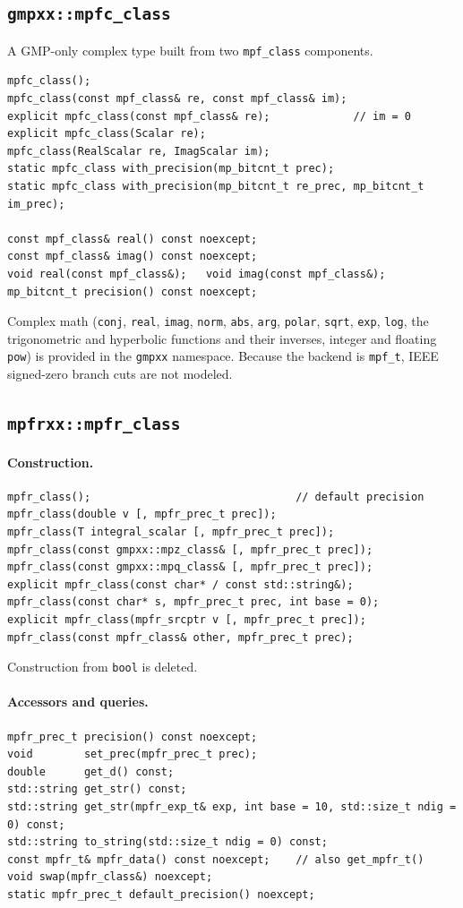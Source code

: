 \documentclass[11pt,a4paper]{article}
\newcommand{\code}[1]{\lstinline!#1!}
\begin{document}
\subsection{\code{gmpxx::mpfc_class}}

A GMP-only complex type built from two \code{mpf_class} components.

\begin{lstlisting}
mpfc_class();
mpfc_class(const mpf_class& re, const mpf_class& im);
explicit mpfc_class(const mpf_class& re);             // im = 0
explicit mpfc_class(Scalar re);
mpfc_class(RealScalar re, ImagScalar im);
static mpfc_class with_precision(mp_bitcnt_t prec);
static mpfc_class with_precision(mp_bitcnt_t re_prec, mp_bitcnt_t im_prec);

const mpf_class& real() const noexcept;
const mpf_class& imag() const noexcept;
void real(const mpf_class&);   void imag(const mpf_class&);
mp_bitcnt_t precision() const noexcept;
\end{lstlisting}

Complex math (\code{conj}, \code{real}, \code{imag}, \code{norm}, \code{abs},
\code{arg}, \code{polar}, \code{sqrt}, \code{exp}, \code{log}, the trigonometric
and hyperbolic functions and their inverses, integer and floating \code{pow}) is
provided in the \code{gmpxx} namespace. Because the backend is \code{mpf_t},
IEEE signed-zero branch cuts are not modeled.

\subsection{\code{mpfrxx::mpfr_class}}

\paragraph{Construction.}
\begin{lstlisting}
mpfr_class();                                // default precision
mpfr_class(double v [, mpfr_prec_t prec]);
mpfr_class(T integral_scalar [, mpfr_prec_t prec]);
mpfr_class(const gmpxx::mpz_class& [, mpfr_prec_t prec]);
mpfr_class(const gmpxx::mpq_class& [, mpfr_prec_t prec]);
explicit mpfr_class(const char* / const std::string&);
mpfr_class(const char* s, mpfr_prec_t prec, int base = 0);
explicit mpfr_class(mpfr_srcptr v [, mpfr_prec_t prec]);
mpfr_class(const mpfr_class& other, mpfr_prec_t prec);
\end{lstlisting}
Construction from \code{bool} is deleted.

\paragraph{Accessors and queries.}
\begin{lstlisting}
mpfr_prec_t precision() const noexcept;
void        set_prec(mpfr_prec_t prec);
double      get_d() const;
std::string get_str() const;
std::string get_str(mpfr_exp_t& exp, int base = 10, std::size_t ndig = 0) const;
std::string to_string(std::size_t ndig = 0) const;
const mpfr_t& mpfr_data() const noexcept;    // also get_mpfr_t()
void swap(mpfr_class&) noexcept;
static mpfr_prec_t default_precision() noexcept;
\end{lstlisting}
\end{document}
